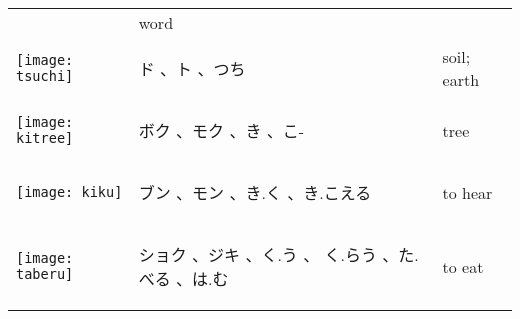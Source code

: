 \documentclass[a4paper,12pt]{extarticle}
\begin{document}
\begin{longtable}{|lp{6cm}p{4cm}|}
	                                   &
	word
	\\
	\begin{minipage}{0.3\textwidth}
		\centerline{
			\texttt{[image: tsuchi]}
		}
	\end{minipage}
	                                   &
	\begin{CJK}{UTF8}{min} ド 、ト 、つち\end{CJK}
	                                   &
	soil; earth
	\\
	\begin{minipage}{0.3\textwidth}
		\centerline{
			\texttt{[image: kitree]}
		}
	\end{minipage}
	                                   &
	\begin{CJK}{UTF8}{min} ボク 、モク 、き 、こ-\end{CJK}
	                                   &
	tree
	\\
	\begin{minipage}{0.3\textwidth}
		\centerline{
			\texttt{[image: kiku]}
		}
	\end{minipage}
	                                   &
	\begin{CJK}{UTF8}{min} ブン 、モン 、き.く 、き.こえる\end{CJK}
	                                   &
	to hear
	\\
	\begin{minipage}{0.3\textwidth}
		\centerline{
			\texttt{[image: taberu]}
		}
	\end{minipage}
	                                   &
	\begin{CJK}{UTF8}{min} ショク 、ジキ 、く.う 、 く.らう 、た.べる 、は.む\end{CJK}
	                                   &
	to eat
	\\

\end{longtable}
\end{document}
